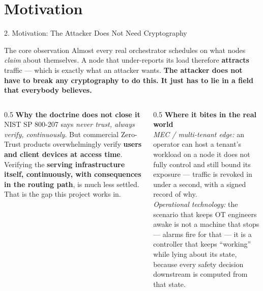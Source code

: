 \documentclass[aspectratio=169, 11pt]{beamer}
\begin{document}
\section{Motivation}

\begin{frame}{2. Motivation: The Attacker Does Not Need Cryptography}
    \scriptsize
    \begin{block}{\footnotesize The core observation}
      \footnotesize
      Almost every real orchestrator schedules on what nodes \emph{claim} about
      themselves. A node that under-reports its load therefore \textbf{attracts}
      traffic --- which is exactly what an attacker wants.
      \textbf{The attacker does not have to break any cryptography to do this.
      It just has to lie in a field that everybody believes.}
    \end{block}

    \vspace{4pt}
    \begin{columns}[T]
      \begin{column}{0.5\textwidth}
        \textbf{Why the doctrine does not close it}\\[3pt]
        NIST SP 800-207 says \emph{never trust, always verify, continuously}.
        But commercial Zero-Trust products overwhelmingly verify \textbf{users
        and client devices at access time}. Verifying the \textbf{serving
        infrastructure itself, continuously, with consequences in the routing
        path}, is much less settled. That is the gap this project works in.
      \end{column}
      \begin{column}{0.5\textwidth}
        \textbf{Where it bites in the real world}\\[3pt]
        \emph{MEC / multi-tenant edge:} an operator can host a tenant's workload
        on a node it does not fully control and still bound its exposure ---
        traffic is revoked in under a second, with a signed record of why.\\[3pt]
        \emph{Operational technology:} the scenario that keeps OT engineers awake
        is not a machine that stops --- alarms fire for that --- it is a
        controller that keeps ``working'' while lying about its state, because
        every safety decision downstream is computed from that state.
      \end{column}
    \end{columns}
\end{frame}
\end{document}

